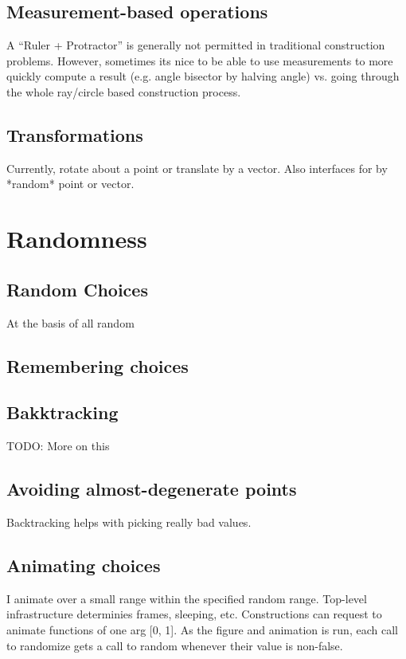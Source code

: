 \subsection{Measurement-based operations}

A ``Ruler + Protractor'' is generally not permitted in traditional
construction problems. However, sometimes its nice to be able to use
measurements to more quickly compute a result (e.g. angle bisector by
halving angle) vs. going through the whole ray/circle based
construction process.

\subsection{Transformations}

Currently, rotate about a point or translate by a vector. Also
interfaces for by *random* point or vector.

\section{Randomness}

\subsection{Random Choices}

At the basis of all random

\subsection{Remembering choices}

\subsection{Bakktracking}

TODO: More on this

\subsection{Avoiding almost-degenerate points}

Backtracking helps with picking really bad values.

\subsection{Animating choices}

I animate over a small range within the specified random
range. Top-level infrastructure determinies frames, sleeping, etc.
Constructions can request to animate functions of one arg [0, 1]. As
the figure and animation is run, each call to randomize gets a call to
random whenever their value is non-false.

